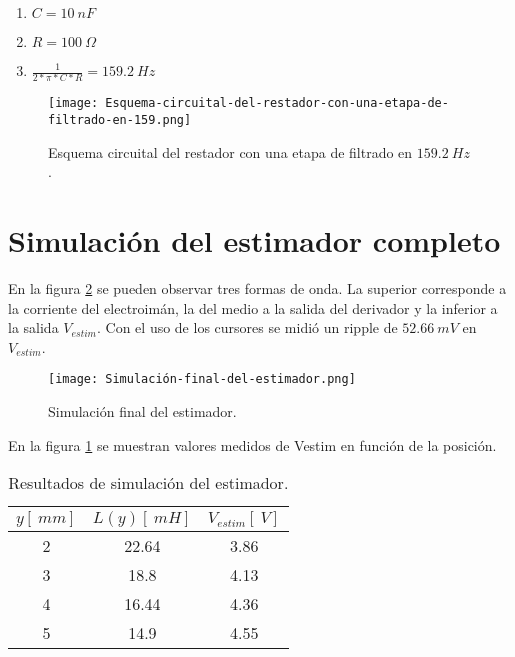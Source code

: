 \begin{enumerate}
	\item  $C=10\: nF$
	
	\item  $R=100\:\Omega$
	
	\item  $\frac{1}{2*\pi *C*R}=159.2\: Hz$
\end{enumerate}

\begin{figure}[H]
	\centering
	\texttt{[image: Esquema-circuital-del-restador-con-una-etapa-de-filtrado-en-159.png]}
	\caption{Esquema circuital del restador con una etapa de filtrado en $159.2\: Hz$.}
	\label{fig:img_Esquema-circuital-del-restador-con-una-etapa-de-filtrado-en-159}
\end{figure}

\section{Simulaci\'{o}n del estimador completo}

\noindent En la figura \ref{fig:img_Simulación_final_del_estimado} se pueden observar tres formas de onda. La superior corresponde a la corriente del electroim\'{a}n, la del medio a la salida del derivador y la inferior a la salida $V_{estim}$. Con el uso de los cursores se midi\'{o} un ripple de $52.66\:mV $ en $V_{estim}$.

\begin{figure}[H]
	\centering
	\texttt{[image: Simulación-final-del-estimador.png]}
	\caption{Simulación final del estimador.}
	\label{fig:img_Simulación_final_del_estimado}
\end{figure}

\noindent En la figura \ref{tab_Resultados_de_simulación_del_estimador} se muestran valores medidos de Vestim en funci\'{o}n de la posici\'{o}n.

\begin{table}[H]
	\begin{center}
		\begin{tabular}{| c | c | c |}
			\hline
		$y [\:mm]$ & $L(y) [\:mH]$ & $V_{estim} [\:V]$ \\ \hline 
		2 & 22.64 & 3.86 \\ \hline 
		3 & 18.8 & 4.13 \\ \hline 
		4 & 16.44 & 4.36 \\ \hline 
		5 & 14.9 & 4.55 \\ \hline 
		\end{tabular}
		\caption{Resultados de simulación del estimador.}
		\label{tab_Resultados_de_simulación_del_estimador}
	\end{center}
\end{table}

